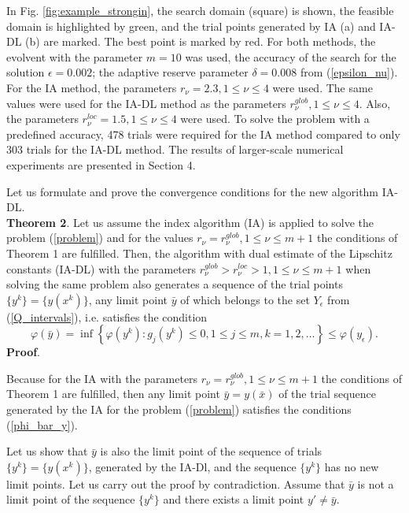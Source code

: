 \documentclass[review]{elsarticle}
\begin{document}
	In Fig. \ref{fig:example_strongin}, the search domain (square) is shown, the feasible domain is highlighted by green, and the trial points generated by IA (a) and IA-DL (b) are marked. The best point is marked by red. For both methods, the evolvent with the parameter $m=10$ was used, the accuracy of the search for the solution $\epsilon=0.002$; the adaptive reserve parameter $\delta=0.008$ from (\ref{epsilon_nu}). For the IA method, the parameters $r_{\nu}=2.3, 1 \leq \nu \leq 4$ were used. The same values were used for the IA-DL method as the parameters $r_{\nu}^{glob}, 1 \leq \nu \leq 4$. Also, the parameters $r_{\nu}^{loc}=1.5, 1 \leq \nu \leq 4$ were used. To solve the problem with a predefined accuracy, 478 trials were required for the IA method compared to only 303 trials for the IA-DL method. The results of larger-scale numerical experiments are presented in Section 4.

	Let us formulate and prove the convergence conditions for the new algorithm IA-DL.\\
\textbf{Theorem 2}. Let us assume the index algorithm (IA) is applied to solve the problem (\ref{problem}) and for the values $r_{\nu}=r_{\nu}^{glob}, 1 \leq \nu \leq m+1$ the conditions of Theorem 1 are fulfilled. Then, the algorithm with dual estimate of the Lipschitz constants (IA-DL) with the parameters $r_{\nu}^{glob}>r_{\nu}^{loc}>1, 1\leq \nu \leq m+1$ when solving the same problem also generates a sequence of the trial points $\{y^k\}=\{y(x^k)\}$, any limit point $\bar{y}$ of which belongs to the set $Y_{\epsilon}$ from (\ref{Q_intervals}), i.e. satisfies the condition 
\begin{equation}\label{phi_bar_y}
	\varphi(\bar y) = \inf\left\{\varphi(y^k):g_j(y^k) \leq 0, 1 \leq j \leq m, k = 1,2,\ldots \right\} \leq \varphi(y_{\epsilon}).
\end{equation}
\textbf{Proof}.

	Because for the IA with the parameters $r_{\nu}=r_{\nu}^{glob}, 1 \leq \nu \leq m+1$ the conditions of Theorem 1 are fulfilled, then any limit point $\bar{y}=y(\bar{x})$ of the trial sequence generated by the IA for the problem (\ref{problem}) satisfies the conditions (\ref{phi_bar_y}).

	Let us show that $\bar y$ is also the limit point of the sequence of trials $\{y^k\}=\{y(x^k)\}$, generated by the IA-Dl, and the sequence $\{y^k\}$ has no new limit points. Let us carry out the proof by contradiction. Assume that $\bar y$ is not a limit point of the sequence $\{y^k\}$ and there exists a limit point $y' \neq \bar y$.
\end{document}
